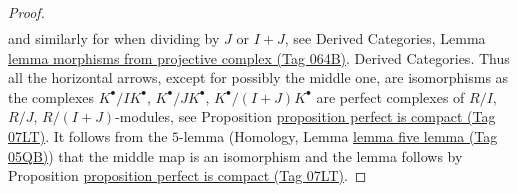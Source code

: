 \documentclass{amsart}
\theoremstyle{plain}
\theoremstyle{definition}
\theoremstyle{remark}
\numberwithin{equation}{subsection}
\begin{document}
\begin{proof}
\begin{align*}
\end{align*}
and similarly for when dividing by $J$ or $I + J$, see
Derived Categories,
Lemma \href{https://stacks.math.columbia.edu/tag/064B}{lemma morphisms from projective complex (Tag 064B)}.
Derived Categories. Thus all the horizontal
arrows, except for possibly the middle one, are isomorphisms as the complexes
$K^\bullet/IK^\bullet$, $K^\bullet/JK^\bullet$, $K^\bullet/(I + J)K^\bullet$
are perfect complexes of $R/I$, $R/J$, $R/(I + J)$-modules, see
Proposition \href{https://stacks.math.columbia.edu/tag/07LT}{proposition perfect is compact (Tag 07LT)}.
It follows from the $5$-lemma (Homology, Lemma \href{https://stacks.math.columbia.edu/tag/05QB}{lemma five lemma (Tag 05QB)})
that the middle map is an isomorphism and the lemma follows by
Proposition \href{https://stacks.math.columbia.edu/tag/07LT}{proposition perfect is compact (Tag 07LT)}.
\end{proof}
\end{document}
